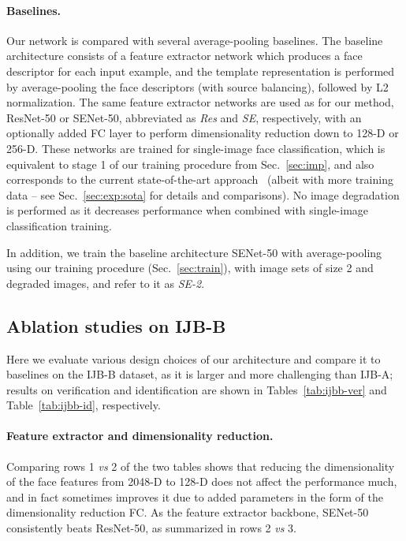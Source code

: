 \documentclass[runningheads]{llncs}
\newcommand{\vs}{\emph{vs }}
\begin{document}
\paragraph{Baselines.}
Our network is compared with several average-pooling baselines.
The baseline architecture consists of a feature extractor network
which produces a face descriptor for each input example,
and the template representation is performed by
average-pooling the face descriptors
(with source balancing), followed by
L2 normalization.
The same feature extractor networks are used
as for our method, ResNet-50 or SENet-50,
abbreviated as \emph{Res} and \emph{SE}, respectively,
with an optionally added FC layer to perform dimensionality reduction
down to 128-D or 256-D.
These networks are trained for single-image face classification,
which is equivalent to stage 1
of our training procedure from Sec.~\ref{sec:imp},
and also corresponds to the current state-of-the-art
approach~\cite{Cao18} (albeit with more training data
-- see Sec.~\ref{sec:exp:sota} for details and comparisons).
No image degradation is performed as it decreases performance
when combined with single-image classification training.

In addition, we train the baseline architecture SENet-50 with
average-pooling
using our training procedure (Sec.~\ref{sec:train}),
\ie with image sets of size 2 and degraded images,
and refer to it as \emph{SE-2}.



\subsection{Ablation studies on IJB-B}

Here we evaluate various design choices of our architecture
and compare it to baselines on the IJB-B dataset,
as it is larger and more challenging than IJB-A;
results on verification and identification are shown in
Tables~\ref{tab:ijbb-ver} and Table~\ref{tab:ijbb-id},
respectively.

\paragraph{Feature extractor and dimensionality reduction.}
Comparing rows 1 \vs 2 of the two tables shows
that reducing the dimensionality of the face features
from 2048-D to 128-D does not affect the performance much,
and in fact sometimes improves it due to added parameters
in the form of the dimensionality reduction FC.
%
%
%
%
%
As the feature extractor backbone,
SENet-50 consistently beats ResNet-50, 
as summarized in rows 2 \vs 3.
\end{document}

